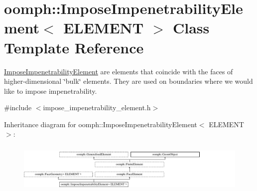 \hypertarget{classoomph_1_1ImposeImpenetrabilityElement}{}\section{oomph\+:\+:Impose\+Impenetrability\+Element$<$ E\+L\+E\+M\+E\+NT $>$ Class Template Reference}
\label{classoomph_1_1ImposeImpenetrabilityElement}


\hyperlink{classoomph_1_1ImposeImpenetrabilityElement}{Impose\+Impenetrability\+Element} are elements that coincide with the faces of higher-\/dimensional \char`\"{}bulk\char`\"{} elements. They are used on boundaries where we would like to impose impenetrability.  




{\ttfamily \#include $<$impose\+\_\+impenetrability\+\_\+element.\+h$>$}

Inheritance diagram for oomph\+:\+:Impose\+Impenetrability\+Element$<$ E\+L\+E\+M\+E\+NT $>$\+:\begin{figure}[H]
\begin{center}
\leavevmode
\includegraphics[height=2.416397cm]{classoomph_1_1ImposeImpenetrabilityElement}
\end{center}
\end{figure}
